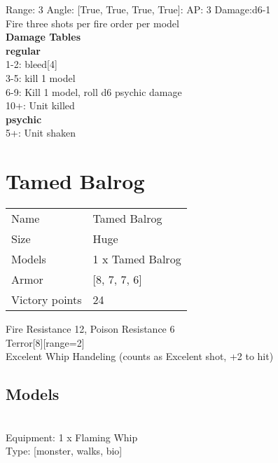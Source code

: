 Range: 3  Angle: [True, True, True, True]: AP: 3 Damage:d6-1 \\
Fire three shots per fire order per model\\ 




 





{\bf Damage Tables} \\
 {\bf regular } \\
1-2: bleed[4] \\
3-5: kill 1 model \\
6-9: Kill 1 model, roll d6 psychic damage \\
10+: Unit killed \\
 {\bf psychic } \\
5+: Unit shaken \\










\pagebreak\pagebreak

\section{ Tamed Balrog }

\begin{tabular}{ll}
  Name & Tamed Balrog \\
  Size & Huge\\
  Models & 1 x Tamed Balrog\\
  Armor & [8, 7, 7, 6]\\
  Victory points & 24\\
\end{tabular}

Fire Resistance 12, Poison Resistance 6\\ 
Terror[8][range=2]\\ 
Excelent Whip Handeling (counts as Excelent shot, +2 to hit)\\ 


\subsection{ Models }

 \\
Equipment: 1 x Flaming Whip \\
Type: [monster, walks, bio] \\

